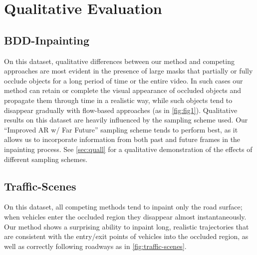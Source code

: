 \section{Qualitative Evaluation}
\subsection{BDD-Inpainting}
On this dataset, qualitative differences between our method and competing approaches are most evident in the presence of large masks that partially or fully occlude objects for a long period of time or the entire video. In such cases our method can retain or complete the visual appearance of occluded objects and propagate them through time in a realistic way, while such objects tend to disappear gradually with flow-based approaches (as in \cref{fig:fig1}). Qualitative results on this dataset are heavily influenced by the sampling scheme used. Our ``Improved AR w/ Far Future'' sampling scheme tends to perform best, as it allows us to incorporate information from both past and future frames in the inpainting process. See \cref{sec:quall} for a qualitative demonstration of the effects of different sampling schemes. 
\subsection{Traffic-Scenes} On this dataset, all competing methods tend to inpaint only the road surface; when vehicles enter the occluded region they disappear almost instantaneously. Our method shows a surprising ability to inpaint long, realistic trajectories that are consistent with the entry/exit points of vehicles into the occluded region, as well as correctly following roadways as in \cref{fig:traffic-scenes}. %
